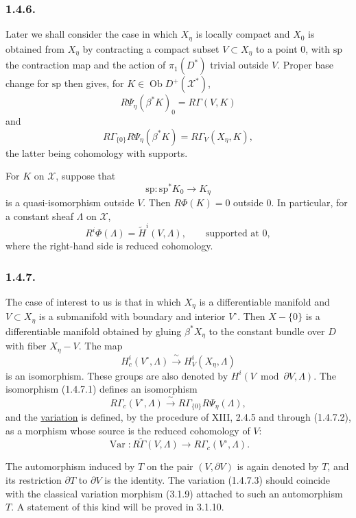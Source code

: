 \subsubsection*{1.4.6.}
Later we shall consider the case in which $X_\eta$ is locally compact
and $X_0$ is obtained from $X_\eta$ by contracting a compact subset
$V\subset X_\eta$ to a point $0$, with $\mathrm{sp}$ the contraction
map and the action of $\pi_1(D^*)$ trivial outside $V$.  Proper base
change for $\mathrm{sp}$ then gives, for
$K\in\operatorname{Ob}D^+(\mathcal X^*)$,
\begin{equation}\tag{1.4.6.1}
R\Psi_\eta(\beta^*K)_0=R\Gamma(V,K)
\end{equation}
and
\begin{equation}\tag{1.4.6.2}
R\Gamma_{\{0\}}R\Psi_\eta(\beta^*K)
=R\Gamma_V(X_\eta,K),
\end{equation}
the latter being cohomology with supports.

For $K$ on $\mathcal X$, suppose that
\[
\mathrm{sp}:\mathrm{sp}^*K_0\longrightarrow K_\eta
\]
is a quasi-isomorphism outside $V$.  Then $R\Phi(K)=0$ outside $0$.
In particular, for a constant sheaf $\Lambda$ on $\mathcal X$,
\[
R^i\Phi(\Lambda)=\widetilde H^i(V,\Lambda),
\qquad\text{supported at }0,
\]
where the right-hand side is reduced cohomology.

\subsubsection*{1.4.7.}
The case of interest to us is that in which $X_\eta$ is a
differentiable manifold and $V\subset X_\eta$ is a submanifold with
boundary and interior $V^\circ$.  Then $X-\{0\}$ is a differentiable
manifold obtained by gluing $\beta^*X_\eta$ to the constant bundle
over $D$ with fiber $X_\eta-V$.  The map
\begin{equation}\tag{1.4.7.1}
H_c^i(V^\circ,\Lambda)
\xrightarrow{\ \sim\ }H_V^i(X_\eta,\Lambda)
\end{equation}
is an isomorphism.  These groups are also denoted by
$H^i(V\bmod\partial V,\Lambda)$.  The isomorphism (1.4.7.1) defines
an isomorphism
\begin{equation}\tag{1.4.7.2}
R\Gamma_c(V^\circ,\Lambda)
\xrightarrow{\ \sim\ }
R\Gamma_{\{0\}}R\Psi_\eta(\Lambda),
\end{equation}
and the \underline{variation} is defined, by the procedure of XIII,
2.4.5 and through (1.4.7.2), as a morphism whose source is the reduced
cohomology of $V$:
\begin{equation}\tag{1.4.7.3}
\operatorname{Var}:
R\widetilde\Gamma(V,\Lambda)
\longrightarrow R\Gamma_c(V^\circ,\Lambda).
\end{equation}

The automorphism induced by $T$ on the pair $(V,\partial V)$ is again
denoted by $T$, and its restriction $\partial T$ to $\partial V$ is
the identity.  The variation (1.4.7.3) should coincide with the
classical variation morphism (3.1.9) attached to such an automorphism
$T$.  A statement of this kind will be proved in 3.1.10.

